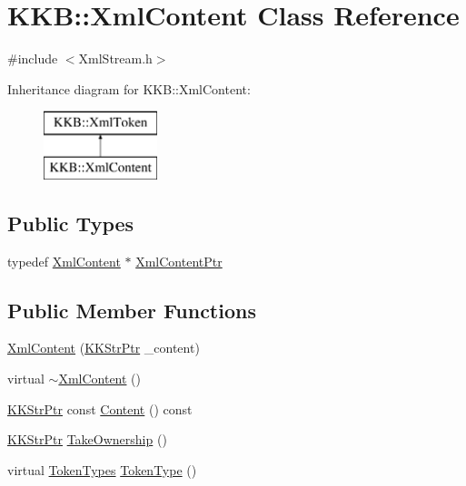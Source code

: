 \hypertarget{class_k_k_b_1_1_xml_content}{}\section{K\+KB\+:\+:Xml\+Content Class Reference}
\label{class_k_k_b_1_1_xml_content}


{\ttfamily \#include $<$Xml\+Stream.\+h$>$}

Inheritance diagram for K\+KB\+:\+:Xml\+Content\+:\begin{figure}[H]
\begin{center}
\leavevmode
\includegraphics[height=2.000000cm]{class_k_k_b_1_1_xml_content}
\end{center}
\end{figure}
\subsection*{Public Types}
\begin{DoxyCompactItemize}
\item 
typedef \hyperlink{class_k_k_b_1_1_xml_content}{Xml\+Content} $\ast$ \hyperlink{class_k_k_b_1_1_xml_content_a3a8c54aef77299a0548008388417b739}{Xml\+Content\+Ptr}
\end{DoxyCompactItemize}
\subsection*{Public Member Functions}
\begin{DoxyCompactItemize}
\item 
\hyperlink{class_k_k_b_1_1_xml_content_aeb42527bcfe7bf9b1aa0c34781e217b2}{Xml\+Content} (\hyperlink{namespace_k_k_b_a9adbef5a6b3be0867f5570df2a08f388}{K\+K\+Str\+Ptr} \+\_\+content)
\item 
virtual \hyperlink{class_k_k_b_1_1_xml_content_a08bb7cedafb02ecd14e369467aede7a3}{$\sim$\+Xml\+Content} ()
\item 
\hyperlink{namespace_k_k_b_a9adbef5a6b3be0867f5570df2a08f388}{K\+K\+Str\+Ptr} const \hyperlink{class_k_k_b_1_1_xml_content_a1d0730aae45b069e8604bef19b8c0098}{Content} () const 
\item 
\hyperlink{namespace_k_k_b_a9adbef5a6b3be0867f5570df2a08f388}{K\+K\+Str\+Ptr} \hyperlink{class_k_k_b_1_1_xml_content_ad9137145da779da77a0a59c5ca1e72a7}{Take\+Ownership} ()
\item 
virtual \hyperlink{class_k_k_b_1_1_xml_token_a18b6e90c919f4b92e3b024f50f247f62}{Token\+Types} \hyperlink{class_k_k_b_1_1_xml_content_a64e6bd4c4e53fbdc749a1a64336640b2}{Token\+Type} ()
\end{DoxyCompactItemize}
